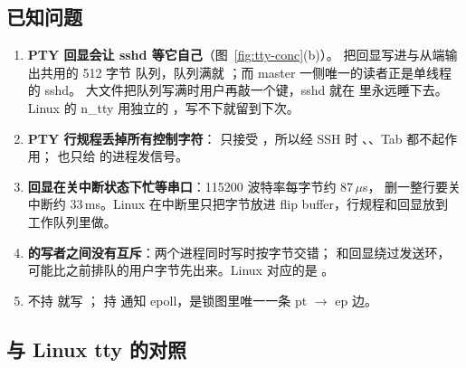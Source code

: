 \subsection{已知问题}

\begin{enumerate}
  \item \textbf{PTY 回显会让 sshd 等它自己}（图~\ref{fig:tty-conc}(b)）。 把回显写进与从端输出共用的 512 字节  队列，队列满就 ；而 master 一侧唯一的读者正是单线程的 sshd。 大文件把队列写满时用户再敲一个键，sshd 就在  里永远睡下去。Linux 的 n\_tty 用独立的 ，写不下就留到下次。
  \item \textbf{PTY 行规程丢掉所有控制字符}： 只接受 ，所以经 SSH 时 、、Tab 都不起作用； 也只给  的进程发信号。
  \item \textbf{回显在关中断状态下忙等串口}：115200 波特率每字节约 87\,$\mu$s， 删一整行要关中断约 33\,ms。Linux 在中断里只把字节放进 flip buffer，行规程和回显放到  工作队列里做。
  \item \textbf{ 的写者之间没有互斥}：两个进程同时写时按字节交错； 和回显绕过发送环，可能比之前排队的用户字节先出来。Linux 对应的是 。
  \item {} 不持  就写 ； 持  通知 epoll，是锁图里唯一一条 pt $\to$ ep 边。
\end{enumerate}

\subsection{与 Linux tty 的对照}


